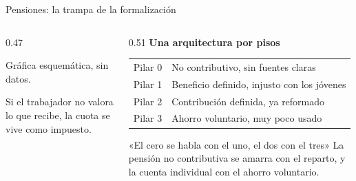 \documentclass[aspectratio=169,11pt]{beamer}
\begin{document}
\begin{frame}{Pensiones: la trampa de la formalización}
  \begin{columns}[T]
    \begin{column}{0.47\textwidth}
      \centering
      {\small\color{cGris}Gráfica esquemática, sin datos.}
      \par\smallskip\raggedright
      Si el trabajador no valora lo que recibe, la cuota se vive como impuesto.
    \end{column}
    \begin{column}{0.51\textwidth}
      \pause
      \textbf{Una arquitectura por pisos}\par\smallskip
      {\small
      \begin{tabular}{@{}l>{\raggedright\arraybackslash}p{5.1cm}@{}}
        \toprule
        Pilar 0 & No contributivo, sin fuentes claras \\
        Pilar 1 & Beneficio definido, injusto con los jóvenes \\
        Pilar 2 & Contribución definida, ya reformado \\
        Pilar 3 & Ahorro voluntario, muy poco usado \\
        \bottomrule
      \end{tabular}}
      \pause
      \begin{block}{«El cero se habla con el uno, el dos con el tres»}
        La pensión no contributiva se amarra con el reparto, y la cuenta individual con el ahorro voluntario.
      \end{block}
    \end{column}
  \end{columns}

\end{frame}
\end{document}

